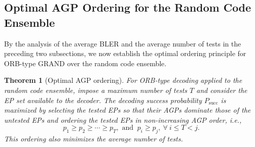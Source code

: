 \documentclass[letterpaper,draftclsnofoot,onecolumn]{IEEEtran}
\newtheorem{theorem}{Theorem}%
\begin{document}
\subsection{Optimal AGP Ordering for the Random Code Ensemble}\label{SubSec:random_conclusion}

By the analysis of the average BLER and the average number of tests in the preceding two subsections, we now establish the optimal ordering principle for ORB-type GRAND over the random code ensemble.

\begin{theorem}[Optimal AGP ordering]\label{th:random_opti}
For ORB-type decoding applied to the random code ensemble, impose a maximum number of tests $T$ and consider the EP set available to the decoder. The decoding success probability $P_{\mathrm{succ}}$ is maximized by selecting the tested EPs so that their AGPs dominate those of the untested EPs and ordering the tested EPs in non-increasing AGP order, i.e.,
 \begin{equation}
     p_1\geq p_2\geq \cdots\geq p_T, \text{ and }\ p_i\geq p_j,\ \forall \ i\leq T<j.
 \end{equation}
This ordering also minimizes the average number of tests.
\end{theorem}
\end{document}
